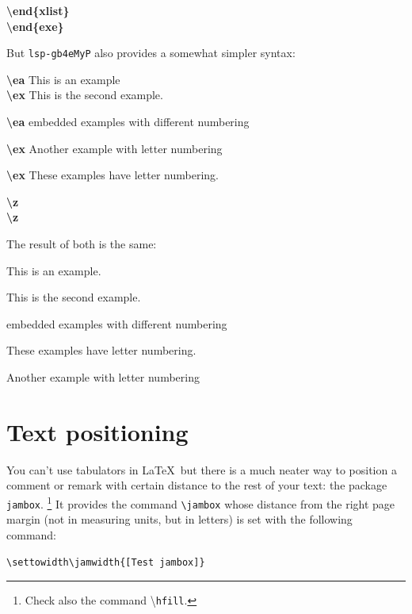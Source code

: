 \textbf{\textbackslash end\{xlist\}}\\
\textbf{\textbackslash end\{exe\}}


But \texttt{lsp-gb4eMyP} also provides a somewhat simpler syntax:

\smallskip

\noindent\textbf{\textbackslash ea} This is an example\\
\textbf{\textbackslash ex} This is the second example.

\textbf{\textbackslash ea} embedded examples with different numbering

\textbf{\textbackslash ex} Another example with letter numbering

\textbf{\textbackslash ex} These examples have letter numbering.

\textbf{\textbackslash z}\\
\textbf{\textbackslash z}

\medskip

The result of both is the same:

\ea\label{ex:1} This is an example.

\ex This is the second example.

	\ea embedded examples with different numbering
	
	\ex These examples have letter numbering.
	
	\ex Another example with letter numbering
	\z   
\z




\section{Text positioning}
\label{ch:TextPositioning}


\settowidth{}

You can't use tabulators in \LaTeX\, but there is a much neater way to position a comment or remark with certain distance to the rest of your text: the package \texttt{jambox}.%
	\footnote{Check also the command \textbackslash \texttt{hfill}.} %
 It provides the command \texttt{\textbackslash jambox} whose distance from the right page margin (not in measuring units, but in letters) is set with the following command:

\medskip

\noindent \verb|\settowidth\jamwidth{[Test jambox]}|

